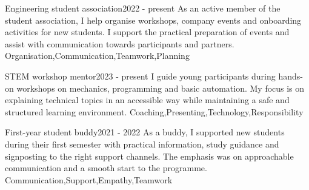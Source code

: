 \begin{volunteerwork}
    \volunteerentry
    {Engineering student association}{2022 - present}
    {As an active member of the student association, I help organise workshops, company events and onboarding activities for new students. I support the practical preparation of events and assist with communication towards participants and partners.}
    {Organisation,Communication,Teamwork,Planning}

    \volunteerentry
    {STEM workshop mentor}{2023 - present}
    {I guide young participants during hands-on workshops on mechanics, programming and basic automation. My focus is on explaining technical topics in an accessible way while maintaining a safe and structured learning environment.}
    {Coaching,Presenting,Technology,Responsibility}

    \volunteerentry
    {First-year student buddy}{2021 - 2022}
    {As a buddy, I supported new students during their first semester with practical information, study guidance and signposting to the right support channels. The emphasis was on approachable communication and a smooth start to the programme.}
    {Communication,Support,Empathy,Teamwork}
\end{volunteerwork}
